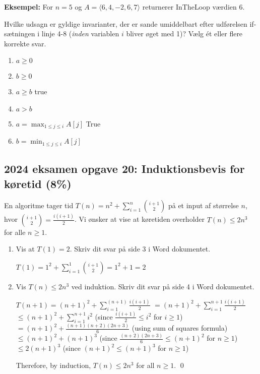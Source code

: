 \documentclass{article}
\theoremstyle{definition}
\begin{document}
\textbf{Eksempel:} For $n = 5$ og $A = \langle 6,4,-2,6,7 \rangle$ returnerer InTheLoop værdien 6.

Hvilke udsagn er gyldige invarianter, der er sande umiddelbart efter udførelsen if-sætningen i linje 4-8 (\emph{inden} variablen $i$ bliver øget med 1)? Vælg ét eller flere korrekte svar.

\begin{enumerate}
    \item $a \geq 0$
    \item $b \geq 0$
    \item $a \geq b$ true
    \item $a > b$
    \item $a = \max_{1 \leq j \leq i} A[j]$ True
    \item $b = \min_{1 \leq j \leq i} A[j]$
\end{enumerate}

\subsection{2024 eksamen opgave 20: Induktionsbevis for køretid (8\%)}

En algoritme tager tid $T(n) = n^2+\sum_{i=1}^n \binom{i+1}{2}$ på et input af størrelse $n$, hvor $\binom{i+1}{2} = \frac{i(i+1)}{2}$.
Vi ønsker at vise at køretiden overholder $T(n) \leq 2n^3$ for alle $n \geq 1$.

\begin{enumerate}
    \item Vis at $T(1) = 2$. Skriv dit svar på side 3 i Word dokumentet.
    
    $T(1) = 1^2 + \sum_{i=1}^1 \binom{i+1}{2} = 1^2 + 1 = 2$
    
    \item Vis $T(n) \leq 2n^3$ ved induktion. Skriv dit svar på side 4 i Word dokumentet.
    
    $T(n+1) = (n+1)^2+\sum_{i=1}^{(n+1)} \frac{i(i+1)}{2}$
    $= (n+1)^2 + \sum_{i=1}^{n+1} \frac{i(i+1)}{2}$
    $\leq (n+1)^2 + \sum_{i=1}^{n+1} i^2$ (since $\frac{i(i+1)}{2} \leq i^2$ for $i \geq 1$)
    $= (n+1)^2 + \frac{(n+1)(n+2)(2n+3)}{6}$ (using sum of squares formula)
    $\leq (n+1)^2 + (n+1)^3$ (since $\frac{(n+2)(2n+3)}{6} \leq (n+1)^2$ for $n \geq 1$)
    $\leq 2(n+1)^3$ (since $(n+1)^2 \leq (n+1)^3$ for $n \geq 1$)

    Therefore, by induction, $T(n) \leq 2n^3$ for all $n \geq 1$. \qed
\end{enumerate}
\end{document}

